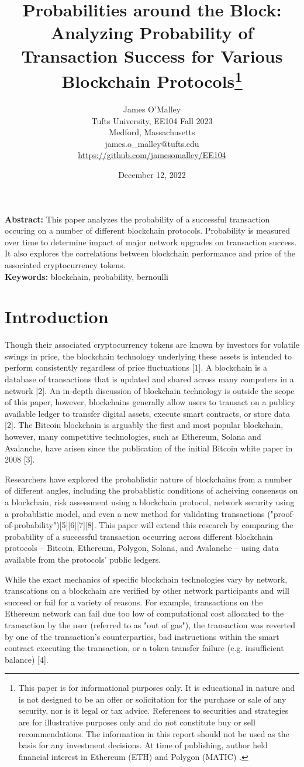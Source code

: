 \documentclass[12pt]{article}
\author{James O'Malley\\
Tufts University, EE104 Fall 2023\\
Medford, Massachusetts\\
james.o\_malley$@$tufts.edu\\
\underline{\href{https://github.com/jamesomalley/EE104}{https://github.com/jamesomalley/EE104}}}
\title{Probabilities around the Block: Analyzing Probability of Transaction Success for Various Blockchain Protocols\footnote{This paper is for informational purposes only. It is educational in nature and is not designed to be an offer or solicitation for the purchase or sale of any security, nor is it legal or tax advice. References to securities and strategies are for illustrative purposes only and do not constitute buy or sell recommendations. The information in this report should not be used as the basis for any investment decisions. At time of publishing, author held financial interest in Ethereum (ETH) and Polygon (MATIC) .}}
\date{December 12, 2022}
\begin{document}
\maketitle

\textbf{Abstract:} This paper analyzes the probability of a successful transaction occuring on a number of different blockchain protocols. Probability is measured over time to determine impact of major network upgrades on transaction success. It also explores the correlations between blockchain performance and price of the associated cryptocurrency tokens.\\

\textbf{Keywords:} blockchain, probability, bernoulli

\pagebreak

\section{Introduction}

Though their associated cryptocurrency tokens are known by investors for volatile swings in price, the blockchain technology underlying these assets is intended to perform consistently regardless of price fluctuations [1]. A blockchain is a database of transactions that is updated and shared across many computers in a network [2]. 
An in-depth discussion of blockchain technology is outside the scope of this paper, however, blockchains generally allow users to transact on a publicy available ledger to transfer digital assets, execute smart contracts, or store data [2]. The Bitcoin blockchain is arguably the first and most popular blockchain, however, many competitive technologies, such as Ethereum, Solana and Avalanche, have arisen since the publication of the initial Bitcoin white paper in 2008 [3].   

Researchers have explored the probablistic nature of blockchains from a number of different angles, including the probablistic conditions of acheiving consensus on a blockchain, risk assessment using a blockchain protocol, network security using a probablistic model, and even a new method for validating transactions ("proof-of-probability")[5][6][7][8]. This paper will extend this research by comparing the probability of a successful transaction occurring across different blockchain protocols -- Bitcoin, Ethereum, Polygon, Solana, and Avalanche -- using data available from the protocols' public ledgers. 

While the exact mechanics of specific blockchain technologies vary by network, transcations on a blockchain are verified by other network participants and will succeed or fail for a variety of reasons. For example, transactions on the Ethereum network can fail due too low of computational cost allocated to the transaction by the user (referred to as "out of gas"), the transaction was reverted by one of the transaction's counterparties, bad instructions within the smart contract executing the transaction, or a token transfer failure (e.g. insufficient balance) [4].
\end{document}
